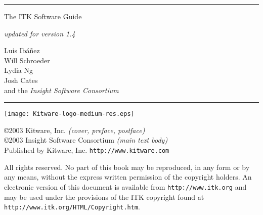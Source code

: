 
\begin{minipage}[t][3cm][b]{\textwidth}
\rule{14cm}{1pt}
\end{minipage}


\begin{minipage}[t][3cm][b]{\textwidth}
\Huge
The ITK Software Guide\\
\normalsize
\par
\emph{updated for version 1.4}\\
\end{minipage}

\hfill
\begin{minipage}[t][6cm][b]{0.6\textwidth}
\Large
\renewcommand{\baselinestretch}{1.5}
Luis Ib\'{a}\~{n}ez\\
Will Schroeder\\
Lydia Ng\\
Josh Cates\\
and the \emph{Insight Software Consortium}
\normalsize
\end{minipage}


\begin{minipage}[t][2cm][b]{\textwidth}
\rule{14cm}{1pt}
\end{minipage}

\newpage

\begin{minipage}[t][4cm][b]{\textwidth}
\begin{center}
\texttt{[image: Kitware-logo-medium-res.eps]}
\end{center}
\par
\begin{center}
\large
\copyright 2003 Kitware, Inc. \emph{(cover, preface, postface)}\\
\copyright 2003 Insight Software Consortium \emph{(main text body)}\\
Published by Kitware, Inc. \texttt{http://www.kitware.com}
\normalsize
\end{center}
\end{minipage}


\begin{minipage}[t][2.25cm][b]{\textwidth}
\begin{center}
All rights reserved. No part of this book may be reproduced, in any form 
or by any means, without the express written permission of the copyright
holders. An electronic version of this document is available from
\texttt{http://www.itk.org} and may be used under the provisions of the
ITK copyright found at \texttt{http://www.itk.org/HTML/Copyright.htm}.
\end{center}
\end{minipage}


